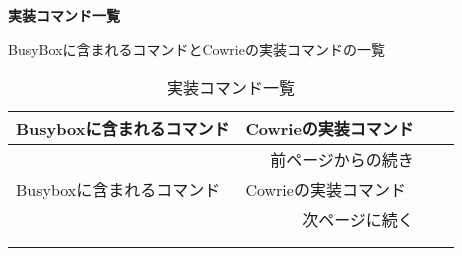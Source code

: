 
\begin{center}
\large{\textbf{実装コマンド一覧}}
\end{center}

BusyBoxに含まれるコマンドとCowrieの実装コマンドの一覧
 
\begin{longtable}{llp{120mm}p{120mm}}
  \caption{実装コマンド一覧}
  \label{table:command} \\
  \hline
  Busyboxに含まれるコマンド & Cowrieの実装コマンド \\ \hline\hline
  \endfirsthead
  \multicolumn{2}{r}{前ページからの続き} \\ \hline
  Busyboxに含まれるコマンド & Cowrieの実装コマンド \\ \hline\hline
  \endhead
  \hline
  \multicolumn{2}{r}{次ページに続く} \\
  \endfoot
  \hline
  \multicolumn{2}{r}{以上} \\
  \endlastfoot


\end{longtable}
